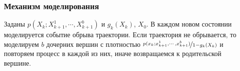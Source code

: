 \documentclass[unicode, notheorems]{beamer}
\begin{document}
\begin{frame}
    \frametitle{Механизм моделирования} 
    Заданы $p(X_k; X_{k+1}^1, \cdots, X_{k+1}^b)$ и $g_k(X_k)$, $X_0$.
    \newline\newline
    В каждом новом состоянии моделируется событие обрыва траектории. Если траектория не обрывается,
    \newline\newline
    то моделируем $b$ дочерних вершин с плотностью $\nicefrac{p(x_k; x_{k+1}^1, \cdots, x_{k+1}^b)}{1 - g_k(X_k)}$ и повторяем процесс в каждой из них,
    \newline\newline
    иначе возвращаемся к родительской вершине.
\end{frame}



\end{document}
